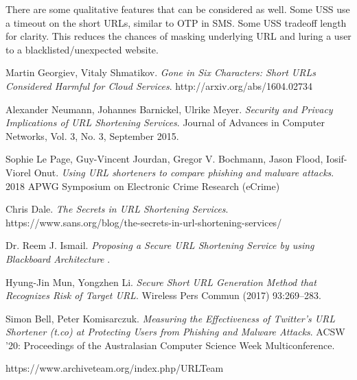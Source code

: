 \documentclass[sigconf, nonacm]{acmart}
\begin{document}
There are some qualitative features that can be considered as well. Some USS use a timeout on the short URLs, similar to OTP in SMS. Some USS tradeoff length for clarity. This reduces the chances of masking underlying URL and luring a user to a blacklisted/unexpected website.

\begin{thebibliography}{9}

Martin Georgiev, Vitaly Shmatikov.
\textit{Gone in Six Characters: Short URLs Considered Harmful for Cloud Services}. 
http://arxiv.org/abs/1604.02734

Alexander Neumann, Johannes Barnickel, Ulrike Meyer.
\textit{Security and Privacy Implications of URL Shortening Services}. 
Journal of Advances in Computer Networks, Vol. 3, No. 3, September 2015.

 Sophie Le Page, Guy-Vincent Jourdan, Gregor V. Bochmann, Jason Flood, Iosif-Viorel Onut.
\textit{Using URL shorteners to compare phishing and malware attacks}.
2018 APWG Symposium on Electronic Crime Research (eCrime)

Chris Dale.
\textit{The Secrets in URL Shortening Services}.
https://www.sans.org/blog/the-secrets-in-url-shortening-services/

Dr. Reem J. Ismail.
\textit{Proposing a Secure URL Shortening Service by 
using Blackboard Architecture }. 

Hyung-Jin Mun, Yongzhen Li.
\textit{Secure Short URL Generation Method that Recognizes Risk of Target URL}.
Wireless Pers Commun (2017) 93:269–283.

Simon Bell, Peter Komisarczuk.
\textit{Measuring the Effectiveness of Twitter’s URL Shortener (t.co) at Protecting Users from Phishing and Malware Attacks}.
ACSW '20: Proceedings of the Australasian Computer Science Week Multiconference.

https://www.archiveteam.org/index.php/URLTeam

\end{thebibliography}
\end{document}

